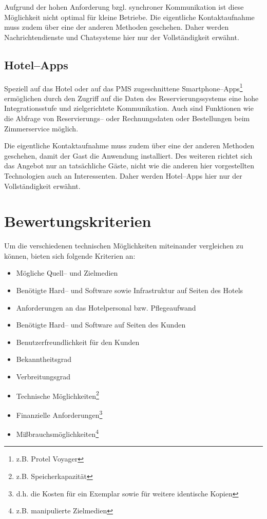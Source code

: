 Aufgrund der hohen Anforderung bzgl. synchroner Kommunikation ist diese Möglichkeit nicht optimal für kleine Betriebe. Die eigentliche Kontaktaufnahme muss zudem über eine der anderen Methoden geschehen. Daher werden Nachrichtendienste und Chatsysteme hier nur der Vollständigkeit erwähnt.

\subsection{Hotel--Apps} %
\label{sub:hotel_apps}
Speziell auf das Hotel oder auf das \ac{PMS} zugeschnittene Smartphone–Apps\footnote{z.B. Protel Voyager} ermöglichen durch den Zugriff auf die Daten des Reservierungssystems eine hohe Integrationsstufe und zielgerichtete Kommunikation. Auch sind Funktionen wie die Abfrage von Reservierungs– oder Rechnungsdaten oder Bestellungen beim Zimmerservice möglich.

Die eigentliche Kontaktaufnahme muss zudem über eine der anderen Methoden geschehen, damit der Gast die Anwendung installiert. Des  weiteren richtet sich das Angebot nur an tatsächliche Gäste, nicht wie die anderen hier vorgestellten Technologien auch an Interessenten. Daher werden Hotel–Apps hier nur der Vollständigkeit erwähnt.




\newpage
\section{Bewertungskriterien} %
\label{sec:kriterien}

Um die verschiedenen technischen Möglichkeiten miteinander vergleichen zu können, bieten sich folgende Kriterien an:

\begin{itemize}
\item Mögliche Quell– und Zielmedien
\item Benötigte Hard-- und Software sowie Infrastruktur auf Seiten des Hotels
\item Anforderungen an das Hotelpersonal bzw. Pflegeaufwand
\item Benötigte Hard-- und Software auf Seiten des Kunden
\item Benutzerfreundlichkeit für den Kunden
\item Bekanntheitsgrad 
\item Verbreitungsgrad 
\item Technische Möglichkeiten\footnote{z.B. Speicherkapazität}
\item Finanzielle Anforderungen\footnote{d.h. die Kosten für ein Exemplar sowie für weitere identische Kopien}
\item Mißbrauchsmöglichkeiten\footnote{z.B. manipulierte Zielmedien}
\end{itemize}


